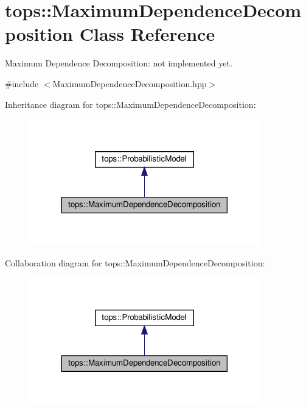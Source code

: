 \hypertarget{classtops_1_1MaximumDependenceDecomposition}{}\section{tops\+:\+:Maximum\+Dependence\+Decomposition Class Reference}
\label{classtops_1_1MaximumDependenceDecomposition}


Maximum Dependence Decomposition\+: not implemented yet.  




{\ttfamily \#include $<$Maximum\+Dependence\+Decomposition.\+hpp$>$}



Inheritance diagram for tops\+:\+:Maximum\+Dependence\+Decomposition\+:
\nopagebreak
\begin{figure}[H]
\begin{center}
\leavevmode
\includegraphics[width=284pt]{classtops_1_1MaximumDependenceDecomposition__inherit__graph}
\end{center}
\end{figure}


Collaboration diagram for tops\+:\+:Maximum\+Dependence\+Decomposition\+:
\nopagebreak
\begin{figure}[H]
\begin{center}
\leavevmode
\includegraphics[width=284pt]{classtops_1_1MaximumDependenceDecomposition__coll__graph}
\end{center}
\end{figure}
